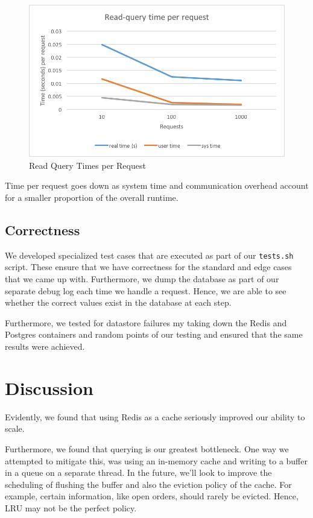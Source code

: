 \documentclass[titlepage, 11pt]{article}
\newcommand\0{\mathbf{0}}
\newcommand\<{\langle}
\renewcommand\>{\rangle}
\begin{document}
\begin{figure}[H]
\centering
\includegraphics[width=\linewidth]{read-query-times-per-request.png}
\caption{Read Query Times per Request}
\end{figure}

Time per request goes down as system time and communication overhead account for a smaller proportion of the overall runtime.

\subsection{Correctness}

We developed specialized test cases that are executed as part of our \texttt{tests.sh} script. These ensure that we have correctness for the standard and edge cases that we came up with. Furthermore, we dump the database as part of our separate debug log each time we handle a request. Hence, we are able to see whether the correct values exist in the database at each step.

Furthermore, we tested for datastore failures my taking down the Redis and Postgres containers and random points of our testing and ensured that the same results were achieved.

\section{Discussion}

Evidently, we found that using Redis as a cache seriously improved our ability to scale.

Furthermore, we found that querying is our greatest bottleneck. One way we attempted to mitigate this, was using an in-memory cache and writing to a buffer in a queue on a separate thread. In the future, we'll look to improve the scheduling of flushing the buffer and also the eviction policy of the cache. For example, certain information, like open orders, should rarely be evicted. Hence, LRU may not be the perfect policy.
\end{document}
